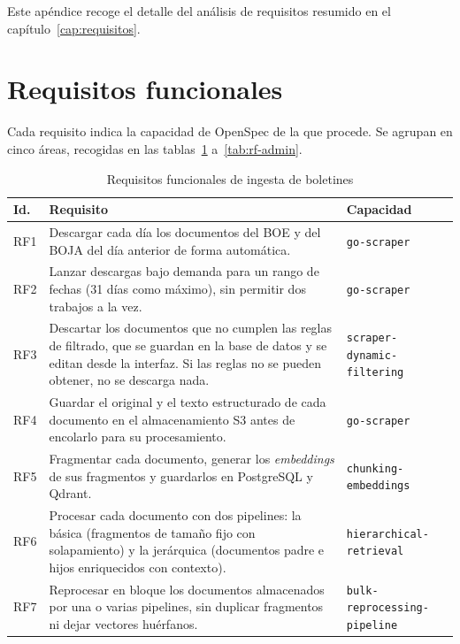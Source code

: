 \label{ap:requisitos}

Este apéndice recoge el detalle del análisis de requisitos resumido en el capítulo~\ref{cap:requisitos}.

\section{Requisitos funcionales}
\label{sec:rf-detalle}

Cada requisito indica la capacidad de OpenSpec de la que procede. Se agrupan en cinco áreas, recogidas en las tablas~\ref{tab:rf-ingesta} a~\ref{tab:rf-admin}.

\begin{table}[htbp]
\centering\small
\caption{Requisitos funcionales de ingesta de boletines}
\label{tab:rf-ingesta}
\begin{tabularx}{\textwidth}{@{}l X l@{}}
\toprule
\textbf{Id.} & \textbf{Requisito} & \textbf{Capacidad} \\
\midrule
RF1 & Descargar cada día los documentos del BOE y del BOJA del día anterior de forma automática. & \texttt{go-scraper} \\
RF2 & Lanzar descargas bajo demanda para un rango de fechas (31 días como máximo), sin permitir dos trabajos a la vez. & \texttt{go-scraper} \\
RF3 & Descartar los documentos que no cumplen las reglas de filtrado, que se guardan en la base de datos y se editan desde la interfaz. Si las reglas no se pueden obtener, no se descarga nada. & \texttt{scraper-dynamic-filtering} \\
RF4 & Guardar el original y el texto estructurado de cada documento en el almacenamiento S3 antes de encolarlo para su procesamiento. & \texttt{go-scraper} \\
RF5 & Fragmentar cada documento, generar los \emph{embeddings} de sus fragmentos y guardarlos en PostgreSQL y Qdrant. & \texttt{chunking-embeddings} \\
RF6 & Procesar cada documento con dos pipelines: la básica (fragmentos de tamaño fijo con solapamiento) y la jerárquica (documentos padre e hijos enriquecidos con contexto). & \texttt{hierarchical-retrieval} \\
RF7 & Reprocesar en bloque los documentos almacenados por una o varias pipelines, sin duplicar fragmentos ni dejar vectores huérfanos. & \texttt{bulk-reprocessing-pipeline} \\
\bottomrule
\end{tabularx}
\end{table}
